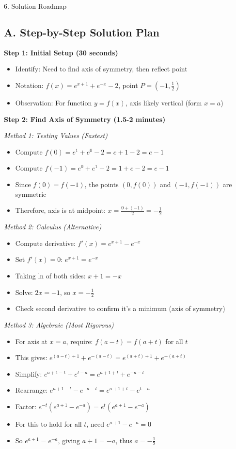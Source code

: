 \documentclass[12pt]{article}
\begin{document}
\begin{roadmapbox}{6. Solution Roadmap}

\subsection*{A. Step-by-Step Solution Plan}

\textbf{Step 1: Initial Setup (30 seconds)}
\begin{itemize}
    \item Identify: Need to find axis of symmetry, then reflect point
    \item Notation: $f(x) = e^{x+1} + e^{-x} - 2$, point $P = (-1, \frac{1}{2})$
    \item Observation: For function $y = f(x)$, axis likely vertical (form $x = a$)
\end{itemize}

\textbf{Step 2: Find Axis of Symmetry (1.5-2 minutes)}

\textit{Method 1: Testing Values (Fastest)}
\begin{itemize}
    \item Compute $f(0) = e^1 + e^0 - 2 = e + 1 - 2 = e - 1$
    \item Compute $f(-1) = e^0 + e^1 - 2 = 1 + e - 2 = e - 1$
    \item Since $f(0) = f(-1)$, the points $(0, f(0))$ and $(-1, f(-1))$ are symmetric
    \item Therefore, axis is at midpoint: $x = \frac{0 + (-1)}{2} = -\frac{1}{2}$
\end{itemize}

\textit{Method 2: Calculus (Alternative)}
\begin{itemize}
    \item Compute derivative: $f'(x) = e^{x+1} - e^{-x}$
    \item Set $f'(x) = 0$: $e^{x+1} = e^{-x}$
    \item Taking ln of both sides: $x + 1 = -x$
    \item Solve: $2x = -1$, so $x = -\frac{1}{2}$
    \item Check second derivative to confirm it's a minimum (axis of symmetry)
\end{itemize}

\textit{Method 3: Algebraic (Most Rigorous)}
\begin{itemize}
    \item For axis at $x = a$, require: $f(a - t) = f(a + t)$ for all $t$
    \item This gives: $e^{(a-t)+1} + e^{-(a-t)} = e^{(a+t)+1} + e^{-(a+t)}$
    \item Simplify: $e^{a+1-t} + e^{t-a} = e^{a+1+t} + e^{-a-t}$
    \item Rearrange: $e^{a+1-t} - e^{-a-t} = e^{a+1+t} - e^{t-a}$
    \item Factor: $e^{-t}(e^{a+1} - e^{-a}) = e^t(e^{a+1} - e^{-a})$
    \item For this to hold for all $t$, need $e^{a+1} - e^{-a} = 0$
    \item So $e^{a+1} = e^{-a}$, giving $a + 1 = -a$, thus $a = -\frac{1}{2}$
\end{itemize}


\end{roadmapbox}
\end{document}
